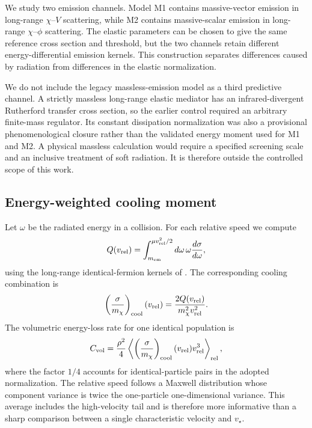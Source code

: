 \documentclass[12pt]{iopart}
\newcommand{\vrel}{v_{\rm rel}}
\newcommand{\vstar}{v_\star}
\begin{document}
We study two emission channels.  Model M1 contains massive-vector emission in
long-range $\chi$--$V$ scattering, while M2 contains massive-scalar emission
in long-range $\chi$--$\phi$ scattering.  The elastic parameters can be chosen
to give the same reference cross section and threshold, but the two channels
retain different energy-differential emission kernels.  This construction
separates differences caused by radiation from differences in the elastic
normalization.

We do not include the legacy massless-emission model as a third predictive
channel.  A strictly massless long-range elastic mediator has an
infrared-divergent Rutherford transfer cross section, so the earlier control
required an arbitrary finite-mass regulator.  Its constant dissipation
normalization was also a provisional phenomenological closure rather than the
validated energy moment used for M1 and M2.  A physical massless calculation
would require a specified screening scale and an inclusive treatment of soft
radiation.  It is therefore outside the controlled scope of this work.

\subsection{Energy-weighted cooling moment}

Let $\omega$ be the radiated energy in a collision.  For each relative speed
we compute
\begin{equation}
  Q(\vrel)=\int_{m_{\rm em}}^{\mu\vrel^2/2}
  d\omega\,\omega\frac{d\sigma}{d\omega},
  \label{eq:q-moment}
\end{equation}
using the long-range identical-fermion kernels of
\citet{LankesterBroche2026}.  The corresponding cooling combination is
\begin{equation}
  \left(\frac{\sigma}{m_\chi}\right)_{\rm cool}(\vrel)
  =\frac{2Q(\vrel)}{m_\chi^2\vrel^2}.
  \label{eq:sigma-cooling}
\end{equation}
The volumetric energy-loss rate for one identical population is
\begin{equation}
  C_{\rm vol}=\frac{\rho^2}{4}
  \left\langle
  \left(\frac{\sigma}{m_\chi}\right)_{\rm cool}(\vrel)
  \vrel^3
  \right\rangle_{\rm rel},
  \label{eq:cooling-moment}
\end{equation}
where the factor $1/4$ accounts for identical-particle pairs in the adopted
normalization.  The relative speed follows a Maxwell distribution whose
component variance is twice the one-particle one-dimensional variance.  This
average includes the high-velocity tail and is therefore more informative
than a sharp comparison between a single characteristic velocity and
$\vstar$.
\end{document}
